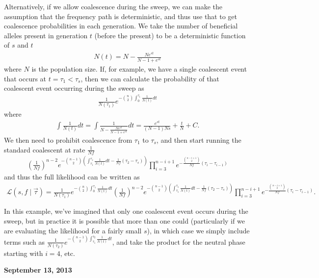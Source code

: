 \documentclass[reqno]{amsart}
\begin{document}
Alternatively, if we allow coalescence during the sweep, we can make the assumption that the frequency path is deterministic, and thus use that to get coalescence probabilities in each generation. We take the number of beneficial alleles present in generation $t$ (before the present) to be a deterministic function of $s$ and $t$
\begin{align}
	N(t) = N - \frac{N e^{st}}{N-1+e^{st}} 
\end{align}
where $N$ is the population size. If, for example, we have a single coalescent event that occurs at $t=\tau_1<\tau_s$, then we can calculate the probability of that coalescent event occurring during the sweep as 
\begin{align}
	\frac{1}{N(\tau_1)}e^{-\binom{n}{2}\int_0^{\tau_1}\frac{1}{N(t)}dt}
\end{align}
where
\begin{align}
	\int\frac{1}{N(t)}dt = \int\frac{1}{N - \frac{Ne^{st}}{N - 1 + e^{st}}}dt = \frac{e^{st}}{\left(N-1\right)Ns} + \frac{t}{N} + C.
\end{align}
We then need to prohibit coalescence from $\tau_1$ to $\tau_s$, and then start running the standard coalescent at rate $\frac{1}{Nf}$
\begin{align}
	\left(\frac{1}{Nf}\right)^{n-2}e^{-\binom{n-1}{2}\left(\int_{\tau_1}^{\tau_s}\frac{1}{N(t)}dt-\frac{1}{Nf}\left(\tau_2-\tau_{s}\right)\right)}\prod_{i=3}^{n-i+1}e^{-\frac{\binom{n-i+1}{2}}{Nf}\left(\tau_i-\tau_{i-1}\right)}
\end{align}
and thus the full likelihood can be written as
\begin{align}
	\mathcal{L}(s,f\mid \vec{\tau})=\frac{1}{N(\tau_1)}e^{-\binom{n}{2}\int_0^{\tau_1}\frac{1}{N(t)}dt}\left(\frac{1}{Nf}\right)^{n-2}e^{-\binom{n-1}{2}\left(\int_{\tau_1}^{\tau_s}\frac{1}{N(t)}dt-\frac{1}{Nf}\left(\tau_2-\tau_{s}\right)\right)}\prod_{i=3}^{n-i+1}e^{-\frac{\binom{n-i+1}{2}}{Nf}\left(\tau_i-\tau_{i-1}\right)}.
\end{align}

In this example, we've imagined that only one coalescent event occurs during the sweep, but in practice it is possible that more than one could (particularly if we are evaluating the likelihood for a fairly small $s$), in which case we simply include terms such as $\frac{1}{N(\tau_2)}e^{-\binom{n-1}{2}\int_{\tau_1}^{\tau_2}\frac{1}{N(t)}dt}$, and take the product for the neutral phase starting with $i=4$, etc.

\begin{flushright}
	\textbf{September 13, 2013}
\end{flushright}
\end{document}

